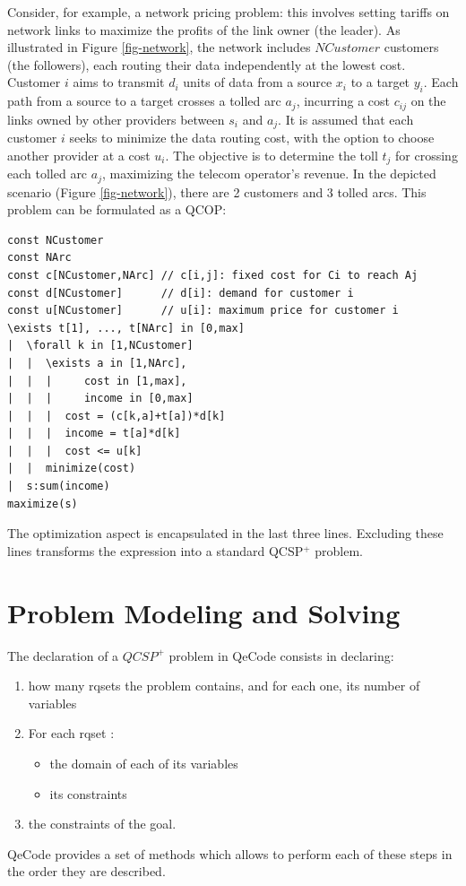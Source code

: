 \documentclass{article}
\begin{document}
Consider, for example, a network pricing problem: this involves setting tariffs on network links to maximize the profits of the link owner (the leader). As illustrated in Figure \ref{fig-network}, the network includes $NCustomer$ customers (the followers), each routing their data independently at the lowest cost. Customer $i$ aims to transmit $d_i$ units of data from a source $x_i$ to a target $y_i$. Each path from a source to a target crosses a tolled arc $a_j$, incurring a cost $c_{ij}$ on the links owned by other providers between $s_i$ and $a_j$. It is assumed that each customer $i$ seeks to minimize the data routing cost, with the option to choose another provider at a cost $u_i$. The objective is to determine the toll $t_j$ for crossing each tolled arc $a_j$, maximizing the telecom operator's revenue. In the depicted scenario (Figure \ref{fig-network}), there are 2 customers and 3 tolled arcs. This problem can be formulated as a QCOP:

{\small
\begin{verbatim}
const NCustomer
const NArc
const c[NCustomer,NArc] // c[i,j]: fixed cost for Ci to reach Aj
const d[NCustomer]      // d[i]: demand for customer i
const u[NCustomer]      // u[i]: maximum price for customer i
\exists t[1], ..., t[NArc] in [0,max]
|  \forall k in [1,NCustomer]
|  |  \exists a in [1,NArc],
|  |  |     cost in [1,max], 
|  |  |     income in [0,max]
|  |  |  cost = (c[k,a]+t[a])*d[k]
|  |  |  income = t[a]*d[k]
|  |  |  cost <= u[k]
|  |  minimize(cost)
|  s:sum(income)
maximize(s)
\end{verbatim}
}

The optimization aspect is encapsulated in the last three lines. Excluding these lines transforms the expression into a standard QCSP$^+$ problem.

\section{Problem Modeling and Solving}

The declaration of a $QCSP^+$ problem in QeCode consists in declaring: 
\begin{enumerate}
\item how many rqsets the problem contains, and for each one, its number of variables
\item For each rqset : 
\begin{itemize}
\item the domain of each of its variables
\item its constraints
\end{itemize} 
\item the constraints of the goal. 
\end{enumerate}
QeCode provides a set of methods which allows to perform each of these steps in the order they are described. 
\end{document}
